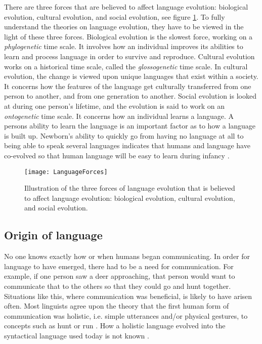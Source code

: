\label{EvoltionaryForces}
There are three forces that are believed to affect language evolution: biological evolution, cultural evolution, and social evolution, see figure \ref{fig:LanguageForces}. To fully understand the theories on language evolution, they have to be viewed in the light of these three forces.
Biological evolution is the slowest force, working on a \textit{phylogenetic} time scale. It involves how an individual improves its abilities to learn and process language in order to survive and reproduce.
Cultural evolution works on a historical time scale, called the \textit{glossogenetic} time scale. In cultural evolution, the change is viewed upon unique languages that exist within a society. It concerns how the features of the language get culturally transferred from one person to another, and from one generation to another.
Social evolution is looked at during one person's lifetime, and the evolution is said to work on an \textit{ontogenetic} time scale. It concerns how an individual learns a language. A persons ability to learn the language is an important factor as to how a language is built up. Newborn's ability to quickly go from having no language at all to being able to speak several languages indicates that humans and language have co-evolved so that human language will be easy to learn during infancy \citep{tomasello2003makes}.

\begin{figure}[ht]
    \centering
    \texttt{[image: LanguageForces]}
    \caption[Illustration of the three forces of language evolution.]{Illustration of the three forces of language evolution that is believed to affect language evolution: biological evolution, cultural evolution, and social evolution.}
    \label{fig:LanguageForces}
\end{figure}

\subsection{Origin of language}
No one knows exactly how or when humans began communicating. In order for language to have emerged, there had to be a need for communication. For example, if one person saw a deer approaching, that person would want to communicate that to the others so that they could go and hunt together. Situations like this, where communication was beneficial, is likely to have arisen often. Most linguists agree upon the theory that the first human form of communication was holistic, i.e. simple utterances and/or physical gestures, to concepts such as hunt or run \citep{christiansen2003language}. How a holistic language evolved into the syntactical language used today is not known \citep{bickerton2007language}.

